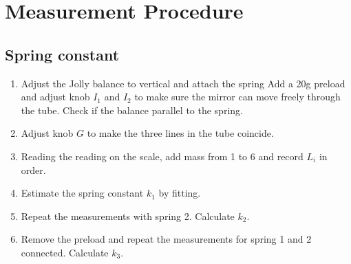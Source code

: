 \section{Measurement Procedure}
\subsection{Spring constant}
    \begin{enumerate}
        \item Adjust the Jolly balance to vertical and attach the spring Add a 20g preload and adjust knob $I_1$ and $I_2$ to make sure the mirror can move freely through the tube. Check if the balance parallel to the spring.
        \item Adjust knob $G$ to make the three lines in the tube coincide.
        \item Reading the reading on the scale, add mass from 1 to 6 and record $L_i$ in order.
        \item Estimate the spring constant $k_1$ by fitting.
        \item Repeat the measurements with spring 2. Calculate $k_2$.
        \item Remove the preload and repeat the measurements for spring 1 and 2 connected. Calculate $k_3$.
    \end{enumerate}
